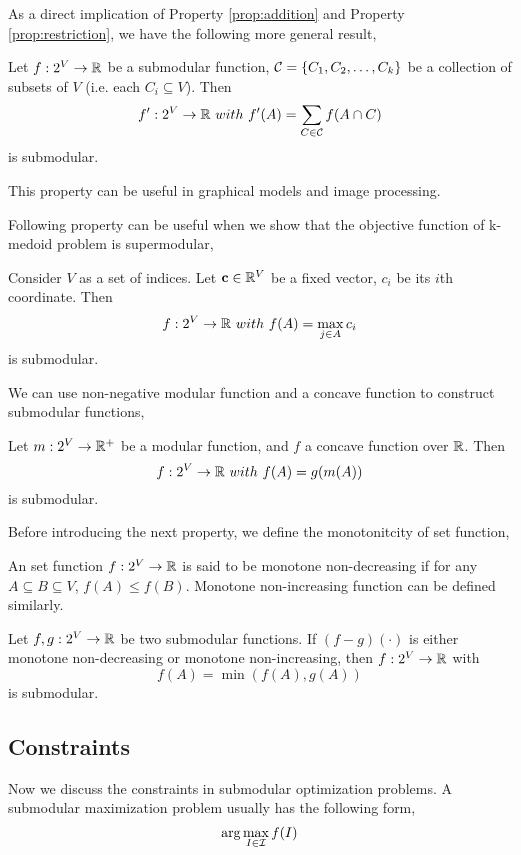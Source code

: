 As a direct implication of Property \ref{prop:addition} and Property \ref{prop:restriction}, we have the following more general result,
\begin{property}
Let $f:2^V \rightarrow \mathbb{R}$ be a submodular function, $\mathcal{C} = \{C_1, C_2, \ldots, C_k\}$ be a collection of subsets of $V$ (i.e. each $C_i \subseteq V$). Then
$$f':2^V \rightarrow \mathbb{R}~{with}~f'(A) = \sum_{C\in\mathcal{C}}f(A\cap C)$$ 
is submodular.
\end{property}
This property can be useful in graphical models and image processing. 


Following property can be useful when we show that the objective function of k-medoid problem is supermodular,
\begin{property}
Consider $V$ as a set of indices. Let $\mathbf{c}\in \mathbb{R}^V$ be a fixed vector, $c_i$ be its $i$th coordinate. Then 
$$f:2^V \rightarrow \mathbb{R}~{with}~ f(A) = \max_{j\in A}c_i$$ 
is submodular.
\end{property}

We can use non-negative modular function and a concave function to construct submodular functions,
\begin{property}
  Let $m: 2^V \rightarrow \mathbb{R}^+$ be a modular function, and $f$ a concave function over $\mathbb{R}$. Then
$$f: 2^V \rightarrow \mathbb{R} ~{with}~ f(A) = g(m(A))$$
is submodular.
\end{property}

Before introducing the next property, we define the monotonitcity of set function,
\begin{definition}[Monotonitcity]
  An set function $f: 2^V \rightarrow  \mathbb{R}$ is said to be monotone non-decreasing if for any $A\subseteq B \subseteq V$, $f(A) \leq f(B)$. Monotone non-increasing function can be defined similarly.
\end{definition}

\begin{property}
  Let $f, g: 2^V \rightarrow \mathbb{R}$ be two submodular functions. If $(f - g)(\cdot)$ is either monotone non-decreasing or monotone non-increasing, then $f: 2^V \rightarrow \mathbb{R}$ with
$$f(A) = \min(f(A), g(A))$$
is submodular.
\end{property}



\subsection{Constraints}
Now we discuss the constraints in submodular optimization problems. A submodular maximization problem usually has the following form,
\begin{equation}
  \label{eq:optimization}
  \arg\max_{I\in\mathcal{I}} f(I)
\end{equation}

